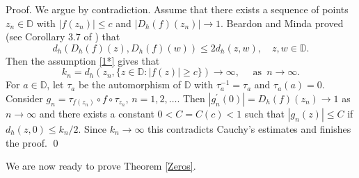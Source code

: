 \documentclass[a4paper,12pt]{article}
\theoremstyle{definition}
\numberwithin{equation}{section}
\newcommand{\D}{\mathbb D}
\begin{document}
Proof. We argue by contradiction. Assume that there exists a sequence of points $z_{n} \in \mathbb{D}$ with $\left|f\left(z_{n}\right)\right| \leq c$ and $\left|D_{h} (f) \left(z_{n}\right)\right| \rightarrow 1$. 
Beardon and Minda proved (see Corollary 3.7 of \cite{BM}) that
$$
d_{h}\left(D_{h} (f) (z), D_{h} (f) (w)\right) \leq 2 d_{h}(z, w), \quad z, w \in \mathbb{D} .
$$
Then the assumption \eqref{1*} gives that
$$
k_{n}=d_{h}\left(z_{n},\{z \in \D:|f(z)| \geqslant c \} \right) \rightarrow \infty , \quad \text{ as } \, n \to \infty . 
$$
For $a \in \D$, let $\tau_a$ be the automorphism of $\D$ with $\tau_a^{-1} = \tau_a$ and $\tau_a (a) =0$. 
Consider $g_{n}= \tau_{f(z_n)} \circ f \circ\tau_{z_n}$, $n=1,2,\ldots$. Then $\left|g_{n}^{\prime}(0)\right|=D_{h} (f)(z_{n} )  \rightarrow 1$ as $n \to \infty$ and there exists a constant $0< C=C(c) < 1$ such that $|g_n (z)| \leq C$ if $d_{h}(z, 0) \leq k_{n} / 2$. Since $k_{n} \rightarrow \infty$ this contradicts Cauchy's estimates and finishes the proof.
\qed

\medskip

We are now ready to prove Theorem \ref{Zeros}. 
\end{document}
